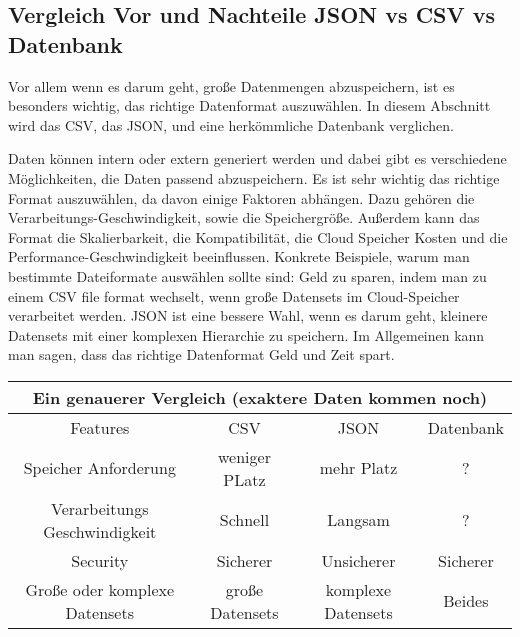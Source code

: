 \subsection{Vergleich Vor und Nachteile JSON vs CSV vs Datenbank}
Vor allem wenn es darum geht, große Datenmengen abzuspeichern, ist es besonders wichtig, das richtige Datenformat auszuwählen. In diesem Abschnitt wird das CSV, das JSON, und eine herkömmliche Datenbank verglichen. 

Daten können intern oder extern generiert werden und dabei gibt es verschiedene Möglichkeiten, die Daten passend abzuspeichern. Es ist sehr wichtig das richtige Format auszuwählen, da davon einige Faktoren abhängen. Dazu gehören die Verarbeitungs-Geschwindigkeit, sowie die Speichergröße. 
Außerdem kann das Format die Skalierbarkeit, die Kompatibilität, die Cloud Speicher Kosten und die Performance-Geschwindigkeit beeinflussen. 
Konkrete Beispiele, warum man bestimmte Dateiformate auswählen sollte sind: Geld zu sparen, indem man zu einem CSV file format wechselt, wenn große Datensets im Cloud-Speicher verarbeitet werden. JSON ist eine bessere Wahl, wenn es darum geht, kleinere Datensets mit einer komplexen Hierarchie zu speichern. 
Im Allgemeinen kann man sagen, dass das richtige Datenformat Geld und Zeit spart.  

\begin{center}
    \begin{tabular}{ |c|c|c|c| } 
     \hline
     \multicolumn{4}{|c|}{Ein genauerer Vergleich (exaktere Daten kommen noch) } \\
     \hline
     \hline
     Features & CSV & JSON & Datenbank \\ 
     \hline 
     \hline
     Speicher Anforderung & weniger PLatz & mehr Platz & ? \\ 
     \hline
     Verarbeitungs Geschwindigkeit & Schnell & Langsam & ? \\ 
     \hline
     Security & Sicherer & Unsicherer & Sicherer \\ 
     \hline
     Große oder komplexe Datensets & große Datensets & komplexe Datensets & Beides \\ 
     \hline
    \end{tabular}
    \end{center}

